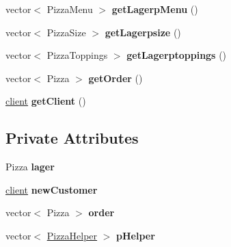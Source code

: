 \begin{CompactItemize}
\item 
\hypertarget{class_sala_89b38b3e2a9835524c9fd21628f485cc}{
vector$<$ Pizza\-Menu $>$ {\bf get\-Lagerp\-Menu} ()}
\label{class_sala_89b38b3e2a9835524c9fd21628f485cc}

\item 
\hypertarget{class_sala_3b0fc00a14ac87f5c78a4ec2f508d67b}{
vector$<$ Pizza\-Size $>$ {\bf get\-Lagerpsize} ()}
\label{class_sala_3b0fc00a14ac87f5c78a4ec2f508d67b}

\item 
\hypertarget{class_sala_aeb754b87d63d395a61539294cbdf064}{
vector$<$ Pizza\-Toppings $>$ {\bf get\-Lagerptoppings} ()}
\label{class_sala_aeb754b87d63d395a61539294cbdf064}

\item 
\hypertarget{class_sala_71e41a58a2a9c2d1927676693909a42c}{
vector$<$ Pizza $>$ {\bf get\-Order} ()}
\label{class_sala_71e41a58a2a9c2d1927676693909a42c}

\item 
\hypertarget{class_sala_a1300ce1d3137fc3bd1b2938612faa1b}{
\hyperlink{classclient}{client} {\bf get\-Client} ()}
\label{class_sala_a1300ce1d3137fc3bd1b2938612faa1b}

\end{CompactItemize}
\subsection*{Private Attributes}
\begin{CompactItemize}
\item 
\hypertarget{class_sala_0f90fe5c344e62852b747ecbdc5b5d90}{
Pizza {\bf lager}}
\label{class_sala_0f90fe5c344e62852b747ecbdc5b5d90}

\item 
\hypertarget{class_sala_d6980eaf5555befe23d2271575d6d9cb}{
\hyperlink{classclient}{client} {\bf new\-Customer}}
\label{class_sala_d6980eaf5555befe23d2271575d6d9cb}

\item 
\hypertarget{class_sala_70a17ffa722a3985b86d30b034ad06d7}{
vector$<$ Pizza $>$ {\bf order}}
\label{class_sala_70a17ffa722a3985b86d30b034ad06d7}

\item 
\hypertarget{class_sala_4b1abb1f80ebc80a2334733ae62acde2}{
vector$<$ \hyperlink{class_pizza_helper}{Pizza\-Helper} $>$ {\bf p\-Helper}}
\label{class_sala_4b1abb1f80ebc80a2334733ae62acde2}

\end{CompactItemize}
